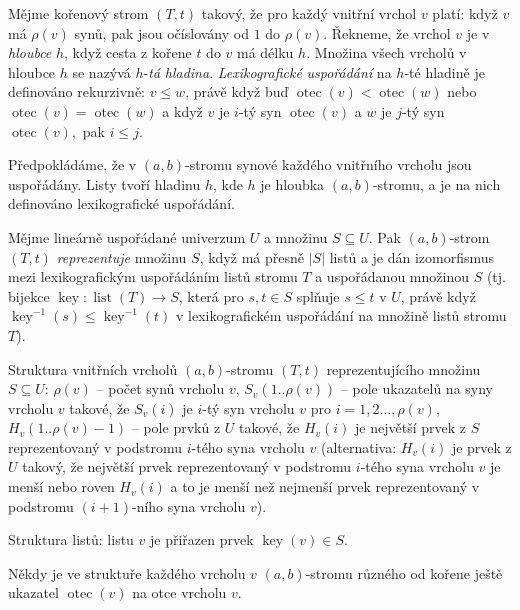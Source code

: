 \documentclass[a4paper,12pt]{article}
\DeclareMathOperator*{\otec}{otec}
\DeclareMathOperator*{\listop}{list}
\DeclareMathOperator*{\key}{key}
\begin{document}
Mějme kořenový strom $(T,t)$ takový, že pro každý 
vnitřní vrchol $v$ platí:\newline 
když $v$ má $\rho (v)$ synů, pak jsou očíslovány od $
1$ do 
$\rho (v)$. Řekne\-me, že vrchol $v$ je v \emph{hloubce} $h$, když 
cesta z kořene $t$ do $v$ má délku $h$. Množina všech 
vrcholů v hloubce $h$ se nazývá $h$-\emph{tá} 
\emph{hladina}. \emph{Lexikografické} \emph{uspořádání} 
na $h$-té hladině je definováno rekurzivně:\newline 
\newline 
$v\le w$, právě když buď $\otec(v)<\otec(w)$ nebo 
$\otec(v)=\otec(w)$ a když $v$ je $i$-tý syn $\otec(v)$ a $w$ je 
$j$-tý syn $\otec(v),$ pak $i\le j$.  

Předpokládáme, že v $(a,b)$-stromu  
synové každého vnitřního vrcholu jsou uspořádány. Listy 
tvoří hladinu $h$, kde $h$ je hloub\-ka $(a,b)$-stromu, a je na nich 
definováno lexikografické uspořá\-dá\-ní.

Mějme lineárně uspořádané univerzum $U$ a 
množinu $S\subseteq U$.  Pak $(a,b)$-strom $(T,t)$ 
\emph{reprezentuje} množinu $S$, když má přesně $|S
|$ 
listů a je dán izomorfismus mezi lexikografickým uspořá\-dá\-ním 
listů stromu $T$ a uspořádanou množinou $S$ 
(tj.  bijekce $\key:\listop(T)\to S$, která pro $s,t\in S$ 
splňuje $s\le t$ v $U$, právě když $\key^{-1}(s)\le\key^{
-1}(t)$ v 
lexikografickém uspořádání na množině listů 
stromu $T$).  

Struktura vnitřních vrcholů 
$(a,b)$-stromu $(T,t)$ reprezentující\-ho množinu 
$S\subseteq U$:\newline 
$\rho (v)$ -- počet synů vrcholu $v$,\newline 
$S_v(1..\rho (v))$ -- pole ukazatelů na syny vrcholu $v$ takové, 
že $S_v(i)$ je $i$-tý syn vrcholu $v$ pro 
$i=1,2\dots,\rho (v)$,\newline 
$H_v(1..\rho (v)-1)$ -- pole prvků z $U$ takové, že $
H_v(i)$ 
je největší prvek z $S$ reprezentovaný v podstromu 
$i$-tého syna vrcholu $v$ (alternativa: $H_v(i)$ je prvek z $U$ 
takový, že největší prvek reprezentovaný v podstromu $
i$-tého 
syna vrcholu $v$ je menší nebo roven $H_v(i)$ a to je menší  
než nejmenší prvek reprezentovaný v podstromu $(i+1)$-ního 
syna vrcholu $v$).

Struktura listů:\newline 
listu $v$ je přiřazen prvek $\key(v)\in S$.

Někdy je ve struktuře každého vrcholu $v$ 
$(a,b)$-stromu různého od kořene ještě ukazatel 
$\otec(v)$ na otce vrcholu $v$.
\end{document}
